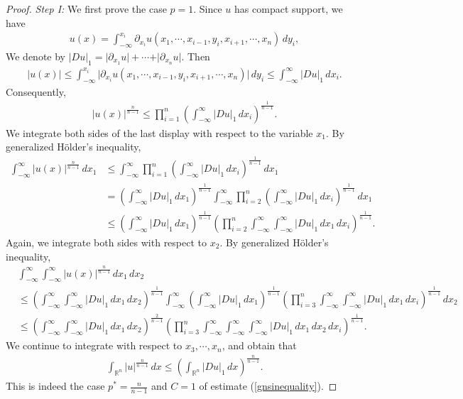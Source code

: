 \documentclass{article}
\numberwithin{equation}{section}
\newcommand{\bbR}{\mathbb{R}}
\theoremstyle{plain}
\theoremstyle{definition}
\begin{document}
\begin{proof}
\textit{Step I:} We first prove the case $p=1$. Since $u$ has compact support, we have
\begin{align*}
	u(x)=\int_{-\infty}^{x_i}\partial_{x_i}u(x_1,\cdots,x_{i-1},y_i,x_{i+1},\cdots,x_n)\,dy_i,
\end{align*}
We denote by $\vert Du\vert_1=\vert\partial_{x_1}u\vert+\cdots+\vert\partial_{x_n}u\vert$. Then
\begin{align*}
	\vert u(x)\vert\leq\int_{-\infty}^{x_i}\vert\partial_{x_i}u(x_1,\cdots,x_{i-1},y_i,x_{i+1},\cdots,x_n)\vert\,dy_i\leq\int_{-\infty}^{\infty}\vert Du\vert_1\,dx_i.
\end{align*}
Consequently,
\begin{align*}
	\vert u(x)\vert^{\frac{n}{n-1}}\leq\prod_{i=1}^n\left(\int_{-\infty}^\infty\vert Du\vert_1\,dx_i\right)^{\frac{1}{n-1}}.
\end{align*}
We integrate both sides of the last display with respect to the variable $x_1$. By generalized Hölder's inequality,
\begin{align*}
	\int_{-\infty}^\infty\vert u(x)\vert^{\frac{n}{n-1}}\,dx_1&\leq	\int_{-\infty}^\infty\prod_{i=1}^n\left(\int_{-\infty}^\infty\vert Du\vert_1\,dx_i\right)^{\frac{1}{n-1}}\,dx_1\\
	&=\left(\int_{-\infty}^\infty\vert Du\vert_1\,dx_1\right)^{\frac{1}{n-1}}\int_{-\infty}^\infty\prod_{i=2}^n\left(\int_{-\infty}^\infty\vert Du\vert_1\,dx_i\right)^{\frac{1}{n-1}}\,dx_1\\
	&\leq\left(\int_{-\infty}^\infty\vert Du\vert_1\,dx_1\right)^{\frac{1}{n-1}}\left(\prod_{i=2}^n\int_{-\infty}^\infty\int_{-\infty}^\infty\vert Du\vert_1\,dx_1\,dx_i\right)^{\frac{1}{n-1}}.
\end{align*}
Again, we integrate both sides with respect to $x_2$. By generalized Hölder's inequality,
\begin{align*}
	&\int_{-\infty}^\infty\int_{-\infty}^\infty\vert u(x)\vert^{\frac{n}{n-1}}\,dx_1\,dx_2\\
	&\leq\left(\int_{-\infty}^\infty\int_{-\infty}^\infty\vert Du\vert_1\,dx_1\,dx_2\right)^{\frac{1}{n-1}}\int_{-\infty}^\infty\left(\int_{-\infty}^\infty\vert Du\vert_1\,dx_1\right)^{\frac{1}{n-1}}\left(\prod_{i=3}^n\int_{-\infty}^\infty\int_{-\infty}^\infty\vert Du\vert_1\,dx_1\,dx_i\right)^{\frac{1}{n-1}}\,dx_2\\
	&\leq\left(\int_{-\infty}^\infty\int_{-\infty}^\infty\vert Du\vert_1\,dx_1\,dx_2\right)^{\frac{2}{n-1}}\left(\prod_{i=3}^n\int_{-\infty}^\infty\int_{-\infty}^\infty\int_{-\infty}^\infty\vert Du\vert_1\,dx_1\,dx_2\,dx_i\right)^{\frac{1}{n-1}}.
\end{align*}
We continue to integrate with respect to $x_3,\cdots,x_n$, and obtain that
\begin{align}
	\int_{\bbR^n}\vert u\vert^{\frac{n}{n-1}}\,dx\leq\left(\int_{\bbR^n}\vert Du\vert_1\,dx\right)^{\frac{n}{n-1}}.\label{gns1}
\end{align}
This is indeed the case $p^*=\frac{n}{n-1}$ and $C=1$ of estimate (\ref{gnsinequality}).\vspace{0.1cm}


\end{proof}
\end{document}
